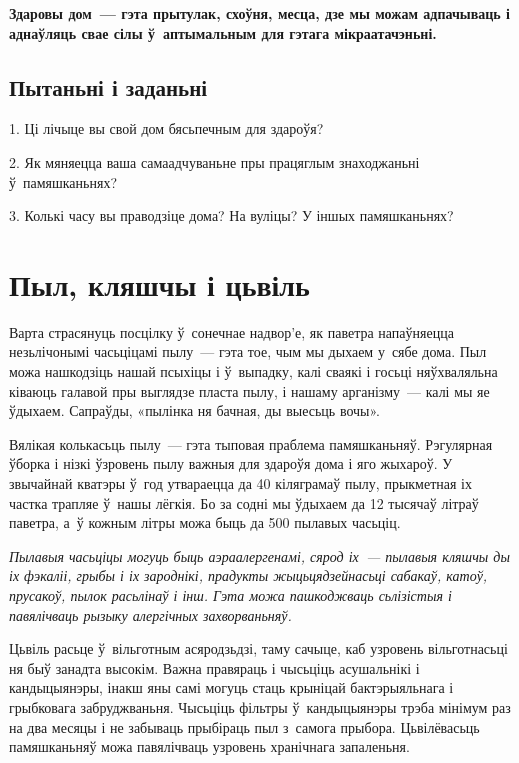 \textbf{Здаровы дом~--- гэта прытулак, схоўня, месца, дзе мы можам адпачываць і аднаўляць свае сілы ў~аптымальным для гэтага мікраатачэньні.}

\subsection*{Пытаньні і заданьні}

1. Ці лічыце вы свой дом бясьпечным для здароўя?

2. Як мяняецца ваша самаадчуваньне пры працяглым знаходжаньні ў~памяшканьнях?

3. Колькі часу вы праводзіце дома? На вуліцы? У іншых памяшканьнях?


\section{Пыл, кляшчы і цьвіль}

Варта страсянуць посцілку ў~сонечнае надвор'е, як паветра напаўняецца незьлічонымі часьціцамі пылу~--- гэта тое, чым мы дыхаем у~сябе дома. Пыл можа нашкодзіць нашай псыхіцы і ў~выпадку, калі сваякі і госьці няўхваляльна ківаюць галавой пры выглядзе пласта пылу, і нашаму арганізму~--- калі мы яе ўдыхаем. Сапраўды, «пылінка ня бачная, ды выесьць вочы». 


Вялікая колькасьць пылу~--- гэта тыповая праблема памяшканьняў. Рэгулярная ўборка і нізкі ўзровень пылу важныя для здароўя дома і яго жыхароў. У звычайнай кватэры ў~год утвараецца да 40 кіляграмаў пылу, прыкметная іх частка трапляе ў~нашы лёгкія. Бо за содні мы ўдыхаем да 12 тысячаў літраў паветра, а~ў кожным літры можа быць да 500 пылавых часьціц.

\emph{Пылавыя часьціцы могуць быць аэраалергенамі, сярод іх~--- пылавыя кляшчы ды іх фэкаліі, грыбы і іх зароднікі, прадукты жыцьцядзейнасьці сабакаў, катоў, прусакоў, пылок расьлінаў і інш. Гэта можа пашкоджваць сьлізістыя і павялічваць рызыку алергічных захворваньняў.}

Цьвіль расьце ў~вільготным асяродзьдзі, таму сачыце, каб узровень вільготнасьці ня быў занадта высокім. Важна правяраць і чысьціць асушальнікі і кандыцыянэры, інакш яны самі могуць стаць крыніцай бактэрыяльнага і грыбковага забруджваньня. Чысьціць фільтры ў~кандыцыянэры трэба мінімум раз на два месяцы і не забываць прыбіраць пыл з~самога прыбора. Цьвілёвасьць памяшканьняў можа павялічваць узровень хранічнага запаленьня.

